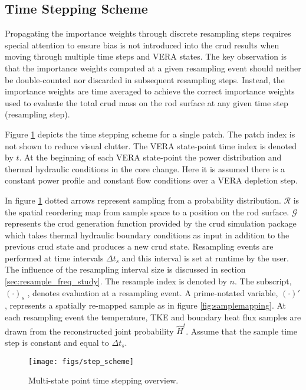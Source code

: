 \subsection{Time Stepping Scheme}
\label{sec:time_step_scheme}

Propagating the importance weights through discrete resampling steps requires special attention to ensure bias is not introduced into the crud results when moving through multiple time steps and VERA states.  The key observation is that the importance weights computed at a given resampling event should neither be double-counted nor discarded in subsequent resampling steps.  Instead, the importance weights are time averaged to achieve the correct importance weights used to evaluate the total crud mass on the rod surface at any given time step (resampling step).

Figure \ref{fig:stepscheme} depicts the time stepping scheme for a single patch. The patch index is not shown to reduce visual clutter. The VERA state-point time index is denoted by $t$.  At the beginning of each VERA state-point the power distribution and thermal hydraulic conditions in the core change.  Here it is assumed there is a constant power profile and constant flow conditions over a VERA depletion step. 

In figure \ref{fig:stepscheme} dotted arrows represent sampling from a probability distribution.  $\mathcal R$ is the spatial reordering map from sample space to a position on the rod surface. $\mathcal G$ represents the crud generation function provided by the crud simulation package which takes thermal hydraulic boundary conditions as input in addition to the previous crud state and produces a new crud state.  Resampling events are performed at time intervals $\Delta t_s$ and this interval is set at runtime by the user.  The influence of the resampling interval size is discussed in section \ref{sec:resample_freq_study}.  The resample index is denoted by $n$.  The subscript, $(\cdot)_s$ , denotes evaluation at a resampling event.  A prime-notated variable,  $(\cdot)'$, represents a spatially re-mapped sample as in figure \ref{fig:samplemapping}.  At each resampling event the temperature, TKE and boundary heat flux samples are drawn from the reconstructed joint probability $\hat H^t$.  Assume that the sample time step is constant and equal to $\Delta t_s$.

\begin{figure}[H]
    \centering
    \texttt{[image: figs/step\_scheme]}
    \caption{Multi-state point time stepping overview.}
    \label{fig:stepscheme}
\end{figure}

